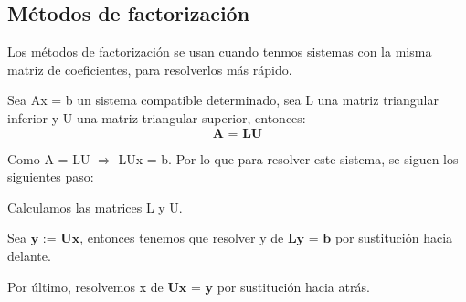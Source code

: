 \subsection{Métodos de factorización}
Los métodos de factorización se usan cuando tenmos sistemas con la misma matriz de coeficientes, para resolverlos más rápido.

\begin{ndef}[Factorización LU]
Sea Ax = b un sistema compatible determinado, sea L una matriz triangular inferior y U una matriz triangular superior, entonces:
\[ \textbf{A = LU} \]
\end{ndef}

Como A = LU $\Rightarrow$ LUx = b. Por lo que para resolver este sistema, se siguen los siguientes paso:

\begin{nlist}
\item Calculamos las matrices L y U.
\item Sea $\textbf{y := Ux}$, entonces tenemos que resolver y de $\textbf{Ly = b}$ por sustitución hacia delante.
\item Por último, resolvemos x de $\textbf{Ux = y}$ por sustitución hacia atrás.
\end{nlist}

